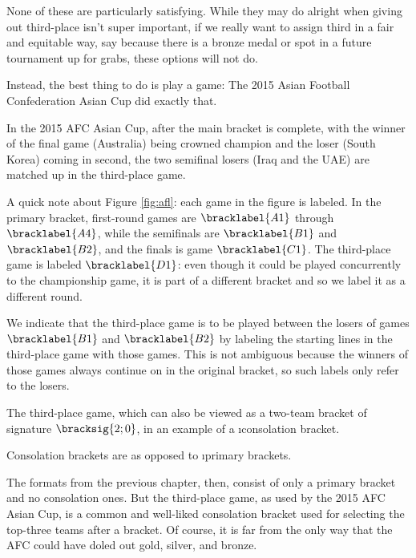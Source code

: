 {    None of these are particularly satisfying. While they may do alright when giving out third-place isn't super important, if we really want to assign third in a fair and equitable way, say because there is a bronze medal or spot in a future tournament up for grabs, these options will not do.

    Instead, the best thing to do is play a game: The 2015 Asian Football Confederation Asian Cup \cite{wiki_afc} did exactly that.


    In the 2015 AFC Asian Cup, after the main bracket is complete, with the winner of the final game (Australia) being crowned champion and the loser (South Korea) coming in second, the two semifinal losers (Iraq and the UAE) are matched up in the third-place game.

    A quick note about Figure \ref{fig:afl}: each game in the figure is labeled. In the primary bracket, first-round games are $\bracklabel{A1}$ through $\bracklabel{A4}$, while the semifinals are $\bracklabel{B1}$ and $\bracklabel{B2}$, and the finals is game $\bracklabel{C1}$. The third-place game is labeled $\bracklabel{D1}$: even though it could be played concurrently to the championship game, it is part of a different bracket and so we label it as a different round.

    We indicate that the third-place game is to be played between the losers of games $\bracklabel{B1}$ and $\bracklabel{B2}$ by labeling the starting lines in the third-place game with those games. This is not ambiguous because the winners of those games always continue on in the original bracket, so such labels only refer to the losers.

    The third-place game, which can also be viewed as a two-team bracket of signature $\bracksig{2;0}$, in an example of a \i{consolation bracket}.


    Consolation brackets are as opposed to \i{primary brackets}.


    The formats from the previous chapter, then, consist of only a primary bracket and no consolation ones. But the third-place game, as used by the 2015 AFC Asian Cup, is a common and well-liked consolation bracket used for selecting the top-three teams after a bracket. Of course, it is far from the only way that the AFC could have doled out gold, silver, and bronze.
    
}
